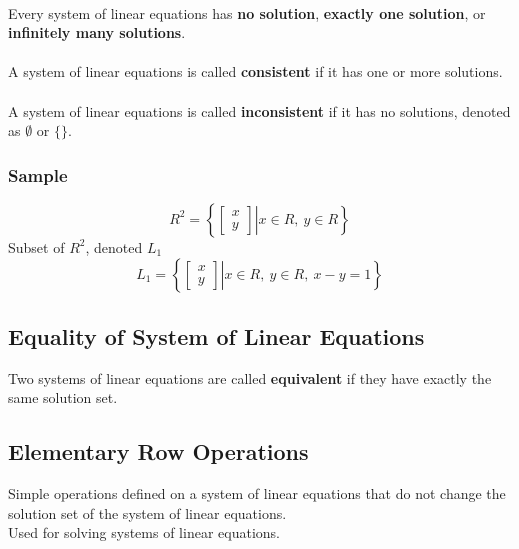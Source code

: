 \documentclass[14pt]{article}
\begin{document}
\begin{CJK}{UTF8}{min}
\paragraph{}
Every system of linear equations has \textbf{no solution}, \textbf{exactly one solution}, or \textbf{infinitely many solutions}.
\paragraph{}
A system of linear equations is called \textbf{consistent} if it has one or more solutions.
\paragraph{}
A system of linear equations is called \textbf{inconsistent} if it has no solutions, denoted as $\emptyset$ or $\lbrace\rbrace$.
\subsubsection{Sample}
\begin{equation}
R^2=
\left\lbrace
\left.
\left[
\begin{array}{c}
x\\y
\end{array}
\right]
\right|
x \in R,\ y \in R
\right\rbrace
\end{equation}
Subset of $R^2$, denoted $L_1$
\begin{equation}
L_1=
\left\lbrace
\left.
\left[
\begin{array}{c}
x\\y
\end{array}
\right]
\right|
x \in R,\ y \in R,\ x-y=1
\right\rbrace
\end{equation}


\subsection{Equality of System of Linear Equations}
Two systems of linear equations are called \textbf{equivalent} if they have exactly the same solution set.

\subsection{Elementary Row Operations}
Simple operations defined on a system of linear equations that do not change the solution set of the system of linear equations.\\
Used for solving systems of linear equations.\\


\end{CJK}
\end{document}
